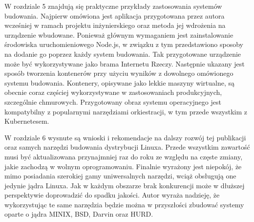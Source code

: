 \documentclass[printmode]{mgr}
\begin{document}
W rozdziale 5 znajdują się praktyczne przykłady zastosowania systemów budowania.
Najpierw omówiona jest aplikacja przygotowana przez autora wcześniej w ramach projektu inżynierskiego oraz metoda jej wdrożenia na urządzenie wbudowane.
Ponieważ głównym wymaganiem jest zainstalowanie środowiska uruchomieniowego Node.js, w związku z tym przedstawiono sposoby na dodanie go poprzez każdy system budowania.
Tak przygotowane urządzenie może być wykorzystywane jako brama Internetu Rzeczy.
Następnie ukazany jest sposób tworzenia kontenerów przy użyciu wyników z dowolnego omówionego systemu budowania.
Kontenery, opisywane jako lekkie maszyny wirtualne, są obecnie coraz częściej wykorzystywane w zastosowaniach produkcyjnych, szczególnie chmurowych.
Przygotowany obraz systemu operacyjnego jest kompatybilny z popularnymi narzędziami orkiestracji, w tym przede wszystkim z Kubernetesem.

W rozdziale 6 wysnute są wnioski i rekomendacje na dalszy rozwój tej publikacji oraz samych narzędzi budowania dystrybucji Linuxa.
Przede wszystkim zawartość musi być aktualizowana przynajmniej raz do roku ze względu na częste zmiany, jakie zachodzą w wolnym oprogramowaniu.
Finalnie wyrażony jest niepokój, że mimo posiadania szerokiej gamy uniwersalnych narzędzi, wciąż obsługują one jedynie jądra Linuxa.
Jak w każdym obszarze brak konkurencji może w dłuższej perspektywie doprowadzić do spadku jakości.
Autor wyraża nadzieję, że wykorzystując te same narzędzia będzie można w przyszłości zbudować systemy oparte o jądra MINIX, BSD, Darvin oraz HURD.
\end{document}
